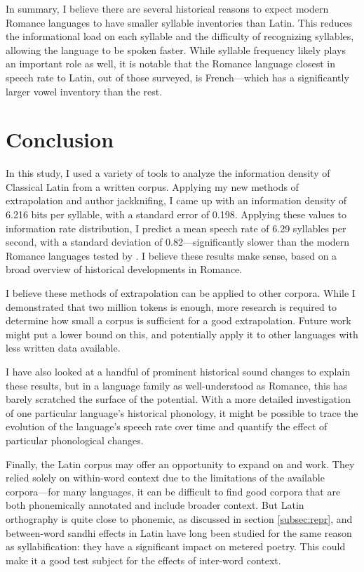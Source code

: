 \documentclass[12pt,twoside,leqno]{article} %
\begin{document}
In summary, I believe there are several historical reasons to expect modern Romance languages to have smaller syllable inventories than Latin. This reduces the informational load on each syllable and the difficulty of recognizing syllables, allowing the language to be spoken faster. While syllable frequency likely plays an important role as well, it is notable that the Romance language closest in speech rate to Latin, out of those surveyed, is French---which has a significantly larger vowel inventory than the rest.

\section{Conclusion}
\label{sec:concl}

In this study, I used a variety of tools to analyze the information density of Classical Latin from a written corpus. Applying my new methods of extrapolation and author jackknifing, I came up with an information density of 6.216 bits per syllable, with a standard error of 0.198. Applying these values to  information rate distribution, I predict a mean speech rate of 6.29 syllables per second, with a standard deviation of 0.82---significantly slower than the modern Romance languages tested by \citeauthor{coupé}. I believe these results make sense, based on a broad overview of historical developments in Romance.

I believe these methods of extrapolation can be applied to other corpora. While I demonstrated that two million tokens is enough, more research is required to determine how small a corpus is sufficient for a good extrapolation. Future work might put a lower bound on this, and potentially apply it to other languages with less written data available.

I have also looked at a handful of prominent historical sound changes to explain these results, but in a language family as well-understood as Romance, this has barely scratched the surface of the potential. With a more detailed investigation of one particular language's historical phonology, it might be possible to trace the evolution of the language's speech rate over time and quantify the effect of particular phonological changes.

Finally, the Latin corpus may offer an opportunity to expand on \citet{oh} and  work. They relied solely on within-word context due to the limitations of the available corpora---for many languages, it can be difficult to find good corpora that are both phonemically annotated and include broader context. But Latin orthography is quite close to phonemic, as discussed in section \ref{subsec:repr}, and between-word sandhi effects in Latin have long been studied for the same reason as syllabification: they have a significant impact on metered poetry. This could make it a good test subject for the effects of inter-word context.
\end{document}
